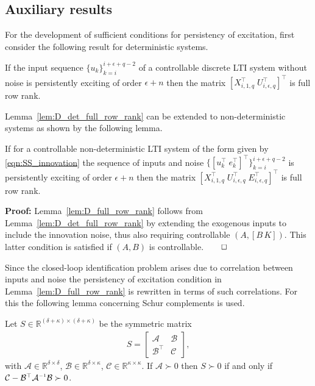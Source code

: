 \subsection{Auxiliary results}\label{sec:aux_results}
For the development of sufficient conditions for persistency of excitation, first consider the following result for deterministic systems.
\begin{lem}\citep[Cor.~2(iii)]{Willems2005}\label{lem:D_det_full_row_rank}
    If the input sequence $\{u_k\}_{k=i}^{i+\epsilon+q-2}$ of a controllable discrete \ac{LTI} system without noise is persistently exciting of order $\epsilon+n$ then the matrix $\left[X_{i,1,q}^\top\;U_{i,\epsilon,q}^\top\right]^\top$ is full row rank.
\end{lem}
Lemma~\ref{lem:D_det_full_row_rank} can be extended to non-deterministic systems as shown by the following lemma.
\begin{lem}\label{lem:D_full_row_rank}
    If for a controllable non-deterministic \ac{LTI} system of the form given by \eqref{eqn:SS_innovation} the sequence of inputs and noise $\{[u_k^\top\;e_k^\top]^\top\}_{k=i}^{i+\epsilon+q-2}$ is persistently exciting of order $\epsilon+n$ then the matrix $\left[X_{i,1,q}^\top\;U_{i,\epsilon,q}^\top\;E_{i,\epsilon,q}^\top\right]^\top$ is full row rank.
\end{lem}
\textbf{Proof:} Lemma~\ref{lem:D_full_row_rank} follows from Lemma~\ref{lem:D_det_full_row_rank} by extending the exogenous inputs to include the innovation noise, thus also requiring controllable $(A,[B\,K])$. This latter condition is satisfied if $(A,B)$ is controllable.$\hfill\qed$

Since the closed-loop identification problem arises due to correlation between inputs and noise the persistency of excitation condition in Lemma~\ref{lem:D_full_row_rank} is rewritten in terms of such correlations. For this the following lemma concerning Schur complements is used.
\begin{lem}\citep[Lem.~2.7(i)]{Verhaegen2007a}\label{lem:Schur_comp}
    Let $S\in\mathbb{R}^{(\delta+\kappa)\times(\delta+\kappa)}$ be the symmetric matrix
    \begin{align*}
        S=\begin{bmatrix}
            \mathcal{A} & \mathcal{B}\\
            \mathcal{B}^\top & \mathcal{C}
        \end{bmatrix},
    \end{align*}
    with $\mathcal{A}\in\mathbb{R}^{\delta \times \delta}$, $\mathcal{B}\in\mathbb{R}^{\delta \times \kappa}$, $\mathcal{C}\in\mathbb{R}^{\kappa \times \kappa}$. If $\mathcal{A}\succ0$ then $S\succ0$ if and only if $\mathcal{C}-\mathcal{B}^\top\mathcal{A}\inv\mathcal{B}\succ0$.
\end{lem}

